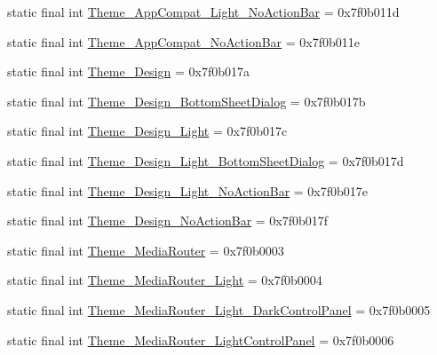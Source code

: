 \begin{CompactItemize}
\item 
static final int \hyperlink{classandroid_1_1support_1_1v7_1_1appcompat_1_1_r_1_1style_6a530643a0e5febeaed6c13ad478c189}{Theme\_\-AppCompat\_\-Light\_\-NoActionBar} = 0x7f0b011d
\item 
static final int \hyperlink{classandroid_1_1support_1_1v7_1_1appcompat_1_1_r_1_1style_891dae4a9b0be9d5ddef6edd3196558e}{Theme\_\-AppCompat\_\-NoActionBar} = 0x7f0b011e
\item 
static final int \hyperlink{classandroid_1_1support_1_1v7_1_1appcompat_1_1_r_1_1style_314d2e47afcf37c17d8c84c7e5093758}{Theme\_\-Design} = 0x7f0b017a
\item 
static final int \hyperlink{classandroid_1_1support_1_1v7_1_1appcompat_1_1_r_1_1style_0c76b0e31c328266f4305826e127187c}{Theme\_\-Design\_\-BottomSheetDialog} = 0x7f0b017b
\item 
static final int \hyperlink{classandroid_1_1support_1_1v7_1_1appcompat_1_1_r_1_1style_b6b35152c076bf1f921a0869a3b7f05a}{Theme\_\-Design\_\-Light} = 0x7f0b017c
\item 
static final int \hyperlink{classandroid_1_1support_1_1v7_1_1appcompat_1_1_r_1_1style_c9d6717a0b512b8092c0a6debf8f1c64}{Theme\_\-Design\_\-Light\_\-BottomSheetDialog} = 0x7f0b017d
\item 
static final int \hyperlink{classandroid_1_1support_1_1v7_1_1appcompat_1_1_r_1_1style_0a835f642793cbc937c71ac57ab7174c}{Theme\_\-Design\_\-Light\_\-NoActionBar} = 0x7f0b017e
\item 
static final int \hyperlink{classandroid_1_1support_1_1v7_1_1appcompat_1_1_r_1_1style_525d94ca4609055218b89f430fc74477}{Theme\_\-Design\_\-NoActionBar} = 0x7f0b017f
\item 
static final int \hyperlink{classandroid_1_1support_1_1v7_1_1appcompat_1_1_r_1_1style_522e84eb3660f925e2063ebf6cf76cfc}{Theme\_\-MediaRouter} = 0x7f0b0003
\item 
static final int \hyperlink{classandroid_1_1support_1_1v7_1_1appcompat_1_1_r_1_1style_49dbb1343a7eff0cd9638431597fbca3}{Theme\_\-MediaRouter\_\-Light} = 0x7f0b0004
\item 
static final int \hyperlink{classandroid_1_1support_1_1v7_1_1appcompat_1_1_r_1_1style_7a2b98b226b7f7d6407337c8d993213e}{Theme\_\-MediaRouter\_\-Light\_\-DarkControlPanel} = 0x7f0b0005
\item 
static final int \hyperlink{classandroid_1_1support_1_1v7_1_1appcompat_1_1_r_1_1style_ea0bc133dcbc7c8498f4fadd399eec1b}{Theme\_\-MediaRouter\_\-LightControlPanel} = 0x7f0b0006
\item 

\end{CompactItemize}
